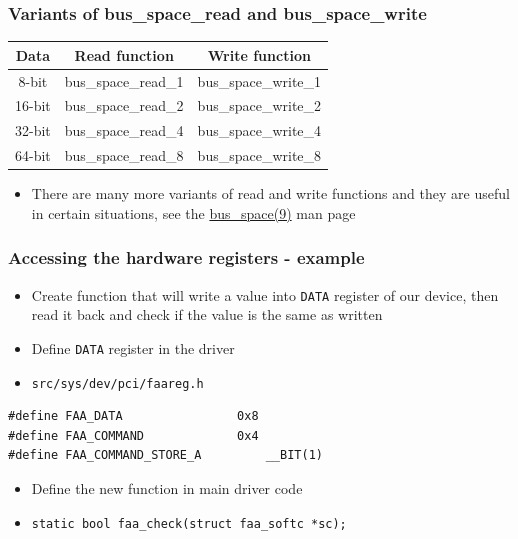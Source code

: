 \documentclass[dvipsnames,table]{beamer}
\begin{document}
\begin{frame}
\frametitle{Variants of bus\_space\_read and bus\_space\_write}
\begin{center}
\begin{tabular}{|c|c|c|}
\hline
Data & Read function & Write function \\
\hline
\hline
8-bit & bus\_space\_read\_1 & bus\_space\_write\_1 \\
\hline
16-bit & bus\_space\_read\_2 & bus\_space\_write\_2 \\
\hline
32-bit & bus\_space\_read\_4 & bus\_space\_write\_4 \\
\hline
64-bit & bus\_space\_read\_8 & bus\_space\_write\_8 \\
\hline
\end{tabular}
\end{center}
\begin{itemize}
	\item There are many more variants of read and write functions and they are useful in certain situations, see the \href{http://netbsd.gw.com/cgi-bin/man-cgi?bus_space++NetBSD-current}{bus\_space(9)} man page
\end{itemize}
\end{frame}

\begin{frame}[fragile]
\frametitle{Accessing the hardware registers - example}
\begin{itemize}
	\item Create function that will write a value into {\tt DATA} register of our device, then read it back and check if the value is the same as written
	\item Define {\tt DATA} register in the driver
	\item {\tt src/sys/dev/pci/faareg.h}
\end{itemize}
\begin{lstlisting}
#define FAA_DATA                0x8
#define FAA_COMMAND             0x4
#define FAA_COMMAND_STORE_A         __BIT(1)
\end{lstlisting}
\begin{itemize}
	\item Define the new function in main driver code
	\item {\tt static bool faa\_check(struct faa\_softc *sc);}
\end{itemize}
\end{frame}
\end{document}
